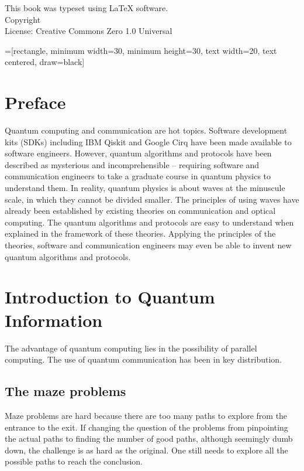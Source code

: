 \documentclass{book}
\makeatletter
\newcommand{\booklicense}{Creative Commons Zero 1.0 Universal}
\newcommand{\bookauthor}{\@author}
\makeatother
\begin{document}
\begin{flushleft}
\vspace*{\fill}
This book was typeset using \LaTeX{} software.\\
\vspace{\fill}
Copyright \textcopyright{} \the\year{}  \bookauthor\\
License: \booklicense
\end{flushleft}

\addtocounter{page}{2}

=[rectangle, minimum width=30, minimum height=30, text width=20, text centered, draw=black]

\chapter*{Preface}
Quantum computing and communication are hot topics. Software development kits (SDKs) including IBM Qiskit and Google Cirq have been made available to software engineers. However, quantum algorithms and protocols have been described as mysterious and incomprehensible -- requiring software and communication engineers to take a graduate course in quantum physics to understand them. In reality, quantum physics is about waves at the minuscule scale, in which they cannot be divided smaller. The principles of using waves have already been established by existing theories on communication and optical computing. The quantum algorithms and protocols are easy to understand when explained in the framework of these theories. Applying the principles of the theories, software and communication engineers may even be able to invent new quantum algorithms and protocols.

\setcounter{tocdepth}{3}
\tableofcontents

\mainmatter

\chapter{Introduction to Quantum Information}
The advantage of quantum computing lies in the possibility of parallel computing. The use of quantum communication has been in key distribution.

\section{The maze problems}
Maze problems are hard because there are too many paths to explore from the entrance to the exit. If changing the question of the problems from pinpointing the actual paths to finding the number of good paths, although seemingly dumb down, the challenge is as hard as the original. One still needs to explore all the possible paths to reach the conclusion.
\end{document}
